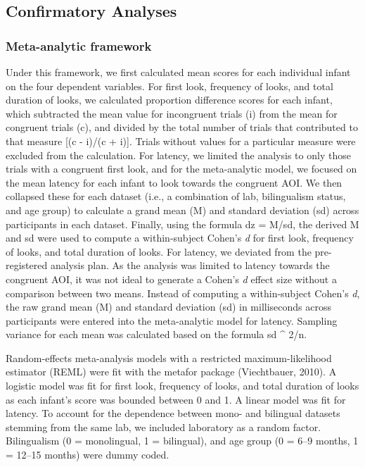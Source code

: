 \documentclass[
  english,
  ,man,floatsintext]{apa6}
\begin{document}
\hypertarget{confirmatory-analyses}{%
\subsection{Confirmatory Analyses}\label{confirmatory-analyses}}

\hypertarget{meta-analytic-framework}{%
\subsubsection{Meta-analytic framework}\label{meta-analytic-framework}}

Under this framework, we first calculated mean scores for each individual infant on the four dependent variables. For first look, frequency of looks, and total duration of looks, we calculated proportion difference scores for each infant, which subtracted the mean value for incongruent trials (i) from the mean for congruent trials (c), and divided by the total number of trials that contributed to that measure {[}(c - i)/(c + i){]}. Trials without values for a particular measure were excluded from the calculation. For latency, we limited the analysis to only those trials with a congruent first look, and for the meta-analytic model, we focused on the mean latency for each infant to look towards the congruent AOI. We then collapsed these for each dataset (i.e., a combination of lab, bilingualism status, and age group) to calculate a grand mean (M) and standard deviation (sd) across participants in each dataset. Finally, using the formula dz = M/sd, the derived M and sd were used to compute a within-subject Cohen's \emph{d} for first look, frequency of looks, and total duration of looks. For latency, we deviated from the pre-registered analysis plan. As the analysis was limited to latency towards the congruent AOI, it was not ideal to generate a Cohen's \emph{d} effect size without a comparison between two means. Instead of computing a within-subject Cohen's \emph{d}, the raw grand mean (M) and standard deviation (sd) in milliseconds across participants were entered into the meta-analytic model for latency. Sampling variance for each mean was calculated based on the formula sd \^{} 2/n.~

Random-effects meta-analysis models with a restricted maximum-likelihood estimator (REML) were fit with the metafor package (Viechtbauer, 2010). A logistic model was fit for first look, frequency of looks, and total duration of looks as each infant's score was bounded between 0 and 1. A linear model was fit for latency. To account for the dependence between mono- and bilingual datasets stemming from the same lab, we included laboratory as a random factor. Bilingualism (0 = monolingual, 1 = bilingual), and age group (0 = 6--9 months, 1 = 12--15 months) were dummy coded.
\end{document}
